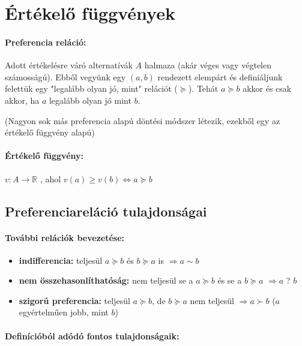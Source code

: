\documentclass[a4paper,12pt]{article}
\begin{document}
\section{Értékelő függvények}


\paragraph{Preferencia reláció: } Adott értékelésre váró alternatívák $A$ halmaza (akár véges vagy végtelen számosságú). Ebből vegyünk egy $(a,b)$ rendezett elempárt és definiáljunk felettük egy "legalább olyan jó, mint" relációt ($\succeq$). Tehát $a \succeq b$ akkor és csak akkor, ha $a$ legalább olyan jó mint $b$. 

\small{(Nagyon sok más preferencia alapú döntési módszer létezik, ezekből egy az értékelő függvény alapú)}

\paragraph{Értékelő függvény: }  $v: A \rightarrow \mathbb{R}$ , ahol $v(a) \geq v(b) \Leftrightarrow a \succeq b$

\subsection{Preferenciareláció tulajdonságai}

\paragraph{További relációk bevezetése:}

\begin{itemize}
\item \textbf{indifferencia:}  teljesül $a \succeq b $ és $b \succeq a$ is $\Rightarrow a \sim b$
\item \textbf{nem összehasonlíthatóság:}  nem teljesül se a $a \succeq b $ és se a $b \succeq a $  $\Rightarrow a$ ? $b$
\item \textbf{szigorú preferencia:} teljesül $a \succeq b $, de $b \succeq a$ nem teljesül $\Rightarrow a \succ b$ ($a$ egyértelműen jobb, mint $b$)
\end{itemize}

\paragraph{Definícióból adódó fontos tulajdonságaik:}
\end{document}

